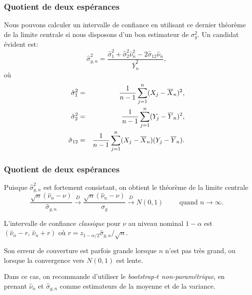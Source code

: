 \documentclass[t,usepdftitle=false]{beamer}
\def\To{\overset{D}{\to}}
\begin{document}
\begin{frame}
\frametitle{Quotient de deux espérances}

Nous pouvons calculer un intervalle de confiance en utilisant ce
dernier théorème de la limite centrale si nous disposons d'un bon
estimateur de $\sigma^2_g$.
Un candidat évident est:
\[
 {\hat\sigma_{g,n}^2} =
 \frac{\hat\sigma_1^2 + \hat\sigma_{2}^2 \hat\nu_n^2 - 2
   \hat\sigma_{12} \hat\nu_n}{\overline{Y}_n^2},
\]
où
\begin{eqnarray*}
 \hat\sigma_1^2 &=& {1\over n-1} \sum_{j=1}^n (X_j - \overline{X}_n)^2,\\
 \hat\sigma_2^2 &=& {1\over n-1} \sum_{j=1}^n (Y_j - \overline{Y}_n)^2,\\
 \hat\sigma_{12} &=& {1\over n-1}
                    \sum_{j=1}^n (X_j - \overline{X}_n)(Y_j-\overline{Y}_n).
\end{eqnarray*}

\end{frame}

\begin{frame}
\frametitle{Quotient de deux espérances}

Puisque $\hat\sigma_{g,n}^2$ est fortement consistant, on obtient le théorème de la limite centrale
\[
     \frac{\sqrt{n}(\hat\nu_n-\nu)}{\hat\sigma_{g,n}} 
 \To \frac{\sqrt{n}(\hat\nu_n-\nu)}{\sigma_{g}} 
 \To N(0,1) \qquad\mbox { quand } n\to\infty.
\]

\mbox{}

L'intervalle de confiance \emph{classique} pour $\nu$ au niveau nominal $1-\alpha$
est $(\hat\nu_n - r,\, \hat\nu_n + r)$ où 
${r} = z_{1-\alpha/2} \hat\sigma_{g,n} / \sqrt{n}$.

\mbox{}

Son erreur de couverture est parfois grande lorsque $n$ n'est pas
très grand, ou lorsque la convergence vers $N(0,1)$ est lente.

\mbox{}

Dans ce cas, on recommande d'utiliser le 
\emph{bootstrap-$t$ non-paramétrique}, en prenant
$\hat\nu_n$ et $\hat\sigma_{g,n}$ comme estimateurs de la 
moyenne et de la variance.

\end{frame}
\end{document}

